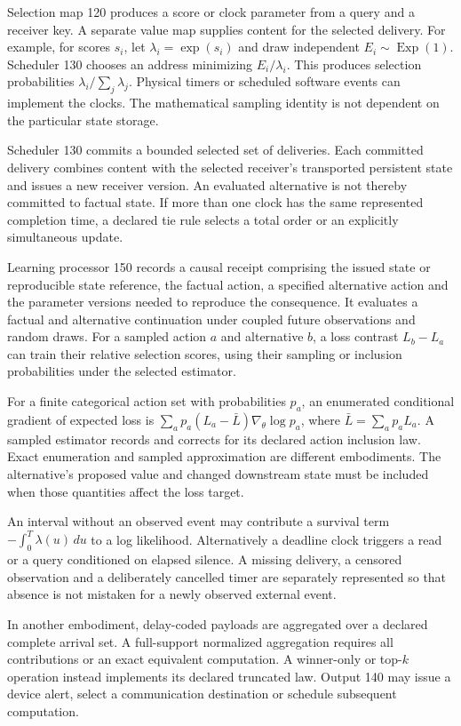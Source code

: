 \documentclass[pct]{sm-patent}
\begin{document}
\pnum Selection map 120 produces a score or clock parameter from a query and a receiver key. A separate value map supplies content for the selected delivery. For example, for scores $s_i$, let $\lambda_i=\exp(s_i)$ and draw independent $E_i\sim\operatorname{Exp}(1)$. Scheduler 130 chooses an address minimizing $E_i/\lambda_i$. This produces selection probabilities $\lambda_i/\sum_j\lambda_j$. Physical timers or scheduled software events can implement the clocks. The mathematical sampling identity is not dependent on the particular state storage.

\pnum Scheduler 130 commits a bounded selected set of deliveries. Each committed delivery combines content with the selected receiver's transported persistent state and issues a new receiver version. An evaluated alternative is not thereby committed to factual state. If more than one clock has the same represented completion time, a declared tie rule selects a total order or an explicitly simultaneous update.

\pnum Learning processor 150 records a causal receipt comprising the issued state or reproducible state reference, the factual action, a specified alternative action and the parameter versions needed to reproduce the consequence. It evaluates a factual and alternative continuation under coupled future observations and random draws. For a sampled action $a$ and alternative $b$, a loss contrast $L_b-L_a$ can train their relative selection scores, using their sampling or inclusion probabilities under the selected estimator.

\pnum For a finite categorical action set with probabilities $p_a$, an enumerated conditional gradient of expected loss is $\sum_a p_a(L_a-\bar L)\nabla_\theta\log p_a$, where $\bar L=\sum_a p_aL_a$. A sampled estimator records and corrects for its declared action inclusion law. Exact enumeration and sampled approximation are different embodiments. The alternative's proposed value and changed downstream state must be included when those quantities affect the loss target.

\pnum An interval without an observed event may contribute a survival term $-\int_0^T\lambda(u)\,du$ to a log likelihood. Alternatively a deadline clock triggers a read or a query conditioned on elapsed silence. A missing delivery, a censored observation and a deliberately cancelled timer are separately represented so that absence is not mistaken for a newly observed external event.

\pnum In another embodiment, delay-coded payloads are aggregated over a declared complete arrival set. A full-support normalized aggregation requires all contributions or an exact equivalent computation. A winner-only or top-$k$ operation instead implements its declared truncated law. Output 140 may issue a device alert, select a communication destination or schedule subsequent computation.
\end{document}

